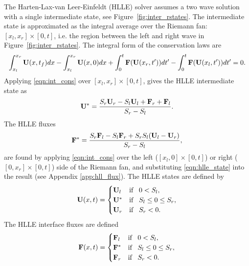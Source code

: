 The Harten-Lax-van Leer-Einfeldt (HLLE) \citep{Einfeldt:1988} solver assumes a two wave solution with a single intermediate state, see Figure~\ref{fig:inter_rstates}.  The intermediate state is approximated as the integral average over the Riemann fan: $[x_l,x_r] \times [0,t]$, i.e. the region between the left and right wave in Figure~\ref{fig:inter_rstates}.   The integral form of the conservation laws are
\begin{gather}
\label{eqn:int_cons}
\int_{x_l}^{x_r} \mathbf{U}(x,t_f) dx - \int_{x_l}^{x_r} \mathbf{U}(x,0) dx + \int_{0}^{t} \mathbf{F}(\mathbf{U}(x_r,t')) dt'
- \int_{0}^{t} \mathbf{F}(\mathbf{U}(x_l,t')) dt' = 0.
\end{gather}
Applying \eqref{eqn:int_cons} over $[x_l,x_r] \times [0,t]$, gives the HLLE intermediate state as
\begin{gather}
\label{eqn:hlle_state}
\mathbf{U}^* = \frac{S_r \mathbf{U}_r - S_l \mathbf{U}_l + \mathbf{F}_r + \mathbf{F}_l }{S_r - S_l}.
\end{gather}
The HLLE fluxes 
\begin{gather}
\label{eqn:hlle_flux}
\mathbf{F}^* = \frac{S_r \mathbf{F}_l - S_l \mathbf{F}_r + S_r S_l (\mathbf{U}_l - \mathbf{U}_r) }{S_r - S_l},
\end{gather}
are found by applying \eqref{eqn:int_cons} over the left ($[x_l,0] \times [0,t]$) or right ($[0,x_r] \times [0,t]$) side of the Riemann fan, and substituting \eqref{eqn:hlle_state} into the result (see Appendix \ref{app:hll_flux}).  The HLLE states are defined by
\begin{gather}
\label{eqn:hlle_states}
\mathbf{U}(x,t) = 
\begin{cases}
\mathbf{U}_l   & \text{if}\;\;\; 0 < S_l, \\
\mathbf{U}^*   & \text{if}\;\;\; S_l \le 0 \le S_r, \\
\mathbf{U}_r   & \text{if}\;\;\; S_r < 0. \\
\end{cases}
\end{gather}
The HLLE interface fluxes are defined 
\begin{gather}
\label{eqn:hlle_fluxes}
\mathbf{F}(x,t) = 
\begin{cases}
\mathbf{F}_l   & \text{if}\;\;\; 0 < S_l, \\
\mathbf{F}^*   & \text{if}\;\;\; S_l \le 0 \le S_r, \\
\mathbf{F}_r   & \text{if}\;\;\; S_r < 0. \\
\end{cases}
\end{gather}

